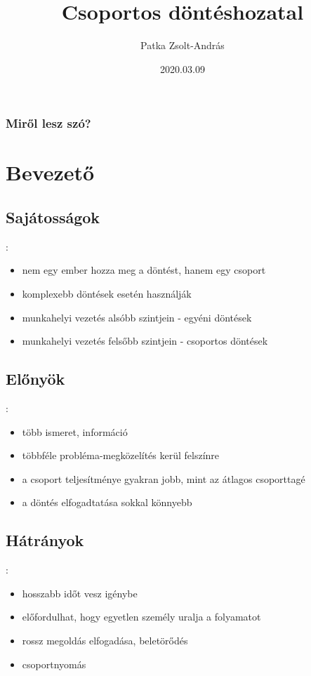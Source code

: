 \documentclass{beamer}
\title{Csoportos döntéshozatal}
\author{Patka Zsolt-András}
\institute{Sapientia EMTE}
\date{2020.03.09}
\begin{document}
\begin{frame}
    \titlepage
\end{frame}

\begin{frame}
\frametitle{Miről lesz szó?}
\tableofcontents
\end{frame}

\section{Bevezető}

\subsection{Sajátosságok}
\begin{frame}{\secname : \subsecname}
    \begin{itemize}
        \item nem egy ember hozza meg a döntést, hanem egy csoport
        \item komplexebb döntések esetén használják
        \item munkahelyi vezetés alsóbb szintjein - egyéni döntések
        \item munkahelyi vezetés felsőbb szintjein - csoportos döntések
    \end{itemize}
\end{frame}

\subsection{Előnyök}
\begin{frame}{\secname : \subsecname}
    \begin{itemize}
        \item több ismeret, információ
        \item többféle probléma-megközelítés kerül felszínre
        \item a csoport teljesítménye gyakran jobb, mint az átlagos csoporttagé
        \item a döntés elfogadtatása sokkal könnyebb
    \end{itemize}
\end{frame}

\subsection{Hátrányok}
\begin{frame}{\secname : \subsecname}
    \begin{itemize}
        \item hosszabb időt vesz igénybe
        \item előfordulhat, hogy egyetlen személy uralja a folyamatot
        \item rossz megoldás elfogadása, beletörődés
        \item csoportnyomás
    \end{itemize}
\end{frame}
\end{document}
